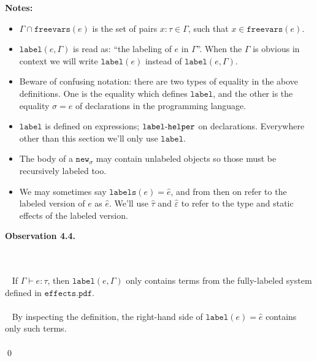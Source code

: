\documentclass{llncs}
\newcommand{\keywadj}[1]{\mathtt{#1}}
\newcommand{\kwa}[1]{\keywadj{ #1 }}
\newcommand{\hyphen}{\hbox{-}}
\newcommand{\thm}[3]{
	\begin{large}
		\bf{#1}
	\end{large} \\\\
	\fbox{Statement.} ~ #2
	\fbox{Proof.}~ #3 \qed
}
\begin{document}
\noindent \textbf{Notes:}
\begin{itemize}
\item $\Gamma \cap \keywadj{freevars}(e)$ is the set of pairs $x : \tau \in \Gamma$, such that $x \in \keywadj{freevars}(e)$.
\item $\keywadj{label}(e, \Gamma)$ is read as: ``the labeling of $e$ in $\Gamma$''. When the $\Gamma$ is obvious in context we will write $\kwa{label}(e)$ instead of $\kwa{label}(e, \Gamma)$.
\item Beware of confusing notation: there are two types of equality in the above definitions. One is the equality which defines $\keywadj{label}$, and the other is the equality $\sigma = e$ of declarations in the programming language.
\item $\keywadj{label}$ is defined on expressions; $\keywadj{label \hyphen helper}$ on declarations. Everywhere other than this section we'll only use $\keywadj{label}$.
\item The body of a $\keywadj{new_\sigma}$ may contain unlabeled objects so those must be recursively labeled too.
\item We may sometimes say $\keywadj{labels}(e) = \hat e$, and from then on refer to the labeled version of $e$ as $\hat e$. We'll use $\hat \tau$ and $\hat \varepsilon$ to refer to the type and static effects of the labeled version.\\
\end{itemize}















\thm{Observation 4.4.}{
If $\Gamma \vdash e : \tau$, then $\kwa{label}(e, \Gamma)$ only contains terms from the fully-labeled system defined in $\kwa{effects.pdf}$.\\\\
}{By inspecting the definition, the right-hand side of $\kwa{label}(e) = \hat e$ contains only such terms.\\\\
}
\end{document}
